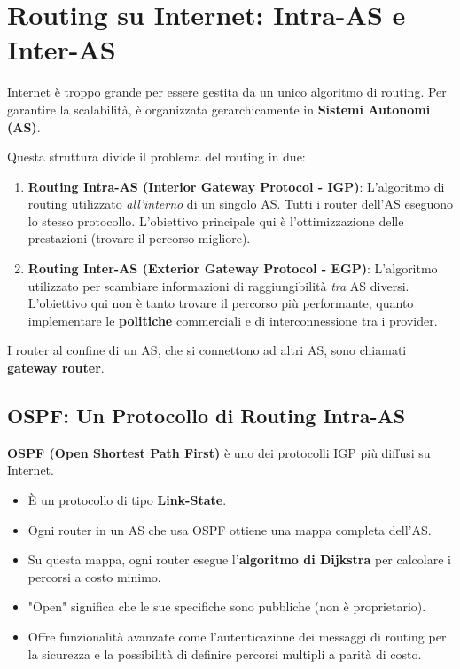 \section{Routing su Internet: Intra-AS e Inter-AS}
Internet è troppo grande per essere gestita da un unico algoritmo di routing. Per garantire la scalabilità, è organizzata gerarchicamente in \textbf{Sistemi Autonomi (AS)}.


Questa struttura divide il problema del routing in due:
\begin{enumerate}
    \item \textbf{Routing Intra-AS (Interior Gateway Protocol - IGP)}: L'algoritmo di routing utilizzato \textit{all'interno} di un singolo AS. Tutti i router dell'AS eseguono lo stesso protocollo. L'obiettivo principale qui è l'ottimizzazione delle prestazioni (trovare il percorso migliore).
    \item \textbf{Routing Inter-AS (Exterior Gateway Protocol - EGP)}: L'algoritmo utilizzato per scambiare informazioni di raggiungibilità \textit{tra} AS diversi. L'obiettivo qui non è tanto trovare il percorso più performante, quanto implementare le \textbf{politiche} commerciali e di interconnessione tra i provider.
\end{enumerate}

I router al confine di un AS, che si connettono ad altri AS, sono chiamati \textbf{gateway router}.

\subsection{OSPF: Un Protocollo di Routing Intra-AS}
\textbf{OSPF (Open Shortest Path First)} è uno dei protocolli IGP più diffusi su Internet.
\begin{itemize}
    \item È un protocollo di tipo \textbf{Link-State}.
    \item Ogni router in un AS che usa OSPF ottiene una mappa completa dell'AS.
    \item Su questa mappa, ogni router esegue l'\textbf{algoritmo di Dijkstra} per calcolare i percorsi a costo minimo.
    \item "Open" significa che le sue specifiche sono pubbliche (non è proprietario).
    \item Offre funzionalità avanzate come l'autenticazione dei messaggi di routing per la sicurezza e la possibilità di definire percorsi multipli a parità di costo.
\end{itemize}

